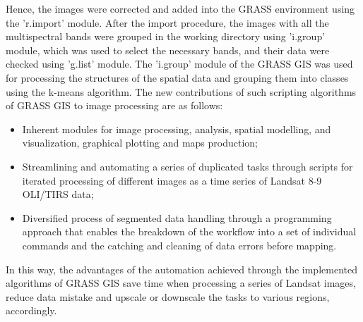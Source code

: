 \documentclass[land,article,accept,pdftex,moreauthors]{Definitions/mdpi}
\begin{document}
Hence, the images were corrected and added into the GRASS environment using {the }'r.import' module. After the import procedure, the images with all the multispectral bands were grouped in the working directory using 'i.group' module, which was used to select the necessary bands, and their data were checked using 'g.list' module. The 'i.group' module of the GRASS GIS was used for processing the structures of the spatial data and grouping them into classes using the k-means algorithm. {The new contributions of such scripting algorithms of GRASS GIS to image processing are as follows: }
\begin{itemize}
	\item {Inherent modules for image processing, analysis, spatial modelling, and visualization, graphical plotting and maps production; }
	\item {Streamlining and automating a series of duplicated tasks through scripts for iterated processing of different images as a time series of Landsat 8-9 OLI/TIRS data; }
	\item {Diversified process of segmented data handling through a programming approach that enables the breakdown of the workflow into a set of individual commands and the catching and cleaning of data errors before mapping.}
\end{itemize}

{ In this way, the advantages of the automation achieved through the implemented algorithms of GRASS GIS save time when processing a series of Landsat images, reduce data mistake and upscale or downscale the tasks to various regions, accordingly.}
\end{document}
